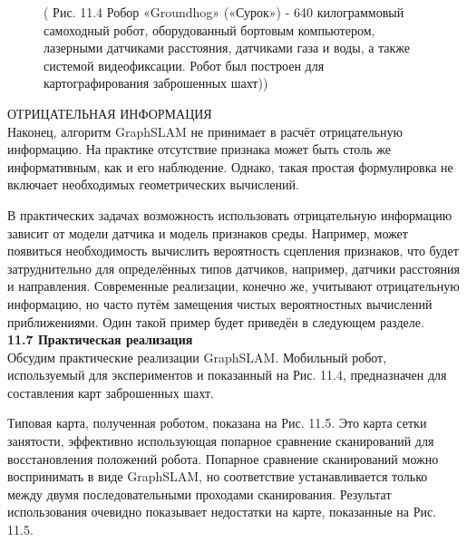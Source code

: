 \documentclass[10pt,a4paper]{article}
\begin{document}
\begin{figure}[H]
	\caption{ ( Рис. 11.4 Робор «Groundhog» («Сурок») - 640 килограммовый самоходный робот, оборудованный бортовым компьютером, лазерными датчиками расстояния, датчиками газа и воды, а также системой видеофиксации. Робот был построен для картографирования заброшенных шахт))}
	\label{fig:114orig}
\end{figure}

ОТРИЦАТЕЛЬНАЯ ИНФОРМАЦИЯ \\

Наконец, алгоритм GraphSLAM не принимает в расчёт отрицательную информацию.
На практике отсутствие признака может быть столь же информативным, как и его наблюдение.  Однако, такая простая формулировка не включает необходимых геометрических вычислений.

В практических задачах возможность использовать отрицательную информацию зависит от модели датчика и модель признаков среды. Например, может появиться необходимость вычислить вероятность сцепления признаков, что будет затруднительно для определённых типов датчиков, например, датчики расстояния и направления. Современные реализации, конечно же, учитывают отрицательную информацию, но часто путём замещения чистых вероятностных вычислений приближениями. Один такой пример будет приведён в следующем разделе.\\

\textbf{11.7	Практическая реализация}\\

Обсудим практические реализации GraphSLAM. Мобильный робот, используемый для экспериментов и показанный на Рис. 11.4, предназначен для составления карт заброшенных шахт.

Типовая карта, полученная роботом, показана на Рис. 11.5. Это карта сетки занятости, эффективно использующая попарное сравнение сканирований для восстановления положений робота. Попарное сравнение сканирований можно воспринимать в виде GraphSLAM, но соответствие устанавливается только между двумя последовательными проходами сканирования. Результат использования очевидно показывает недостатки на карте, показанные на Рис. 11.5.
\end{document}
